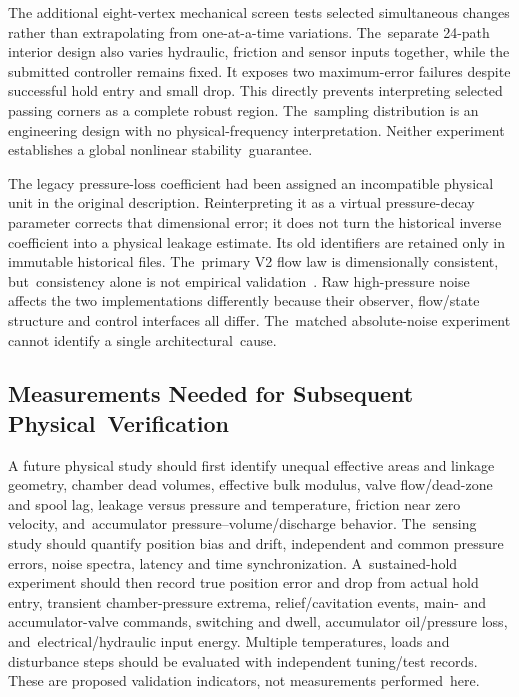 \documentclass[machines,article,submit,pdftex,moreauthors]{Definitions/mdpi}
\begin{document}
The additional eight-vertex mechanical screen tests selected simultaneous changes rather than extrapolating from one-at-a-time variations. The~separate 24-path interior design also varies hydraulic, friction and sensor inputs together, while the submitted controller remains fixed. It exposes two maximum-error failures despite successful hold entry and small drop. This directly prevents interpreting selected passing corners as a complete robust region. The~sampling distribution is an engineering design with no physical-frequency interpretation. Neither experiment establishes a global nonlinear stability~guarantee.

The legacy pressure-loss coefficient had been assigned an incompatible physical unit in the original description. Reinterpreting it as a virtual pressure-decay parameter corrects that dimensional error; it does not turn the historical inverse coefficient into a physical leakage estimate. Its old identifiers are retained only in immutable historical files. The~primary V2 flow law is dimensionally consistent, but~consistency alone is not empirical \mbox{validation~\cite{sargent2013}}. Raw high-pressure noise affects the two implementations differently because their observer, flow/state structure and control interfaces all differ. The~matched absolute-noise experiment cannot identify a single architectural~cause.

\subsection{Measurements Needed for Subsequent Physical~Verification}
A future physical study should first identify unequal effective areas and linkage geometry, chamber dead volumes, effective bulk modulus, valve flow/dead-zone and spool lag, leakage versus pressure and temperature, friction near zero velocity, and~accumulator pressure--volume/discharge behavior. The~sensing study should quantify position bias and drift, independent and common pressure errors, noise spectra, latency and time synchronization. A~sustained-hold experiment should then record true position error and drop from actual hold entry, transient chamber-pressure extrema, relief/cavitation events, main- and accumulator-valve commands, switching and dwell, accumulator oil/pressure loss, and~electrical/hydraulic input energy. Multiple temperatures, loads and disturbance steps should be evaluated with independent tuning/test records. These are proposed validation indicators, not measurements performed~here.
\end{document}

